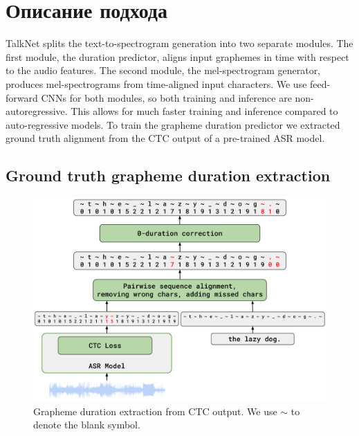\section{Описание подхода}

TalkNet splits the text-to-spectrogram generation into two separate modules. The first module, the duration predictor, aligns input graphemes in time with respect to the audio features. The second module, the mel-spectrogram generator, produces mel-spectrograms from time-aligned input characters. We use feed-forward CNNs for both modules, so both training and inference are non-autoregressive. This allows for much faster training and inference compared to auto-regressive models. To train the grapheme duration predictor we extracted ground truth alignment from the CTC output of a pre-trained ASR model.  

\subsection{Ground truth grapheme duration extraction}

\begin{figure}[!ht]
\centering
\includegraphics[width=1.0\textwidth]{images/alignment.png}
\caption{Grapheme duration extraction from CTC output. We use $\sim$ to denote the blank symbol.}
\label{fig:alignment}
\end{figure}

